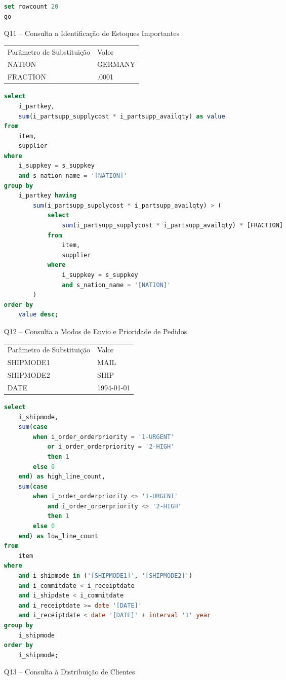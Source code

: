 \begin{enumerate}
\begin{lstlisting}[language=SQL]
set rowcount 20
go
	\end{lstlisting}

\item[Q11 --] Consulta a Identificação de Estoques Importantes

\begin{tabular}{ll}
	Parâmetro de Substituição & Valor\\
	NATION & GERMANY\\
	FRACTION & .0001
\end{tabular}

	\begin{lstlisting}[language=SQL]
select
	i_partkey,
	sum(i_partsupp_supplycost * i_partsupp_availqty) as value
from
	item,
	supplier
where
	i_suppkey = s_suppkey
	and s_nation_name = '[NATION]'
group by
	i_partkey having
		sum(i_partsupp_supplycost * i_partsupp_availqty) > (
			select
				sum(i_partsupp_supplycost * i_partsupp_availqty) * [FRACTION]
			from
				item,
				supplier
			where
				i_suppkey = s_suppkey
				and s_nation_name = '[NATION]'
		)
order by
	value desc;
	\end{lstlisting}

\item[Q12 --] Consulta a Modos de Envio e Prioridade de Pedidos

\begin{tabular}{ll}
	Parâmetro de Substituição & Valor\\
	SHIPMODE1 & MAIL\\
	SHIPMODE2 & SHIP\\
	DATE & 1994-01-01 \\
\end{tabular}

	\begin{lstlisting}[language=SQL]
select
	i_shipmode,
	sum(case
		when i_order_orderpriority = '1-URGENT'
			or i_order_orderpriority = '2-HIGH'
			then 1
		else 0
	end) as high_line_count,
	sum(case
		when i_order_orderpriority <> '1-URGENT'
			and i_order_orderpriority <> '2-HIGH'
			then 1
		else 0
	end) as low_line_count
from
	item
where
	and i_shipmode in ('[SHIPMODE1]', '[SHIPMODE2]')
	and i_commitdate < i_receiptdate
	and i_shipdate < i_commitdate
	and i_receiptdate >= date '[DATE]'
	and i_receiptdate < date '[DATE]' + interval '1' year
group by
	i_shipmode
order by
	i_shipmode;
	\end{lstlisting}
	
\item[Q13 --] Consulta à Distribuição de Clientes


\end{enumerate}

